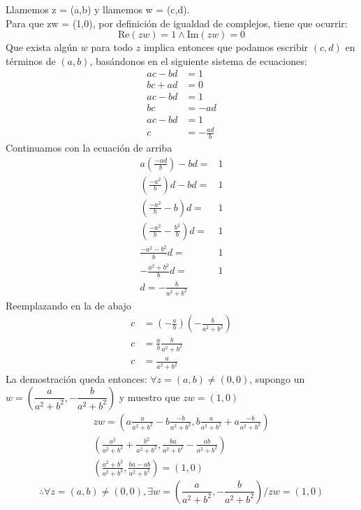 \documentclass[10pt]{article}
\begin{document}
\begin{prf}[$\forall z \neq (0,0) \exists w / zw = (1,0)$]{}
	Llamemos z = (a,b) y llamemos w = (c,d).\\
	Para que zw = (1,0), por definición de igualdad de complejos, tiene que ocurrir: 
	\begin{equation}
		\text{Re}(zw) = 1 \land \text{Im}(zw) = 0
	\end{equation}
	Que exista algún $w$ para todo $z$ implica entonces que podamos escribir $(c,d)$ en términos de $(a,b)$, basándonos en el siguiente sistema de ecuaciones:
	\begin{align}
		ac - bd &= 1\\
		bc + ad &= 0\\
		ac - bd &= 1\\
		bc &= -ad\\
		ac - bd &= 1\\
		c &= -\frac{ad}{b}
	\end{align}
	Continuamos con la ecuación de arriba
	\begin{align}
		a\left(\frac{-ad}{b}\right) - bd =& 1\\
		\left(\frac{-a^2}{b}\right)d - bd =& 1\\
		\left(\frac{-a^2}{b} - b\right)d =& 1\\
		\left(\frac{-a^2}{b} - \frac{b^2}{b}\right)d =& 1\\
		\frac{-a^2 - b^2}{b}d =& 1\\
		-\frac{a^2 + b^2}{b}d =& 1\\
		d = -\frac{b}{a^2 + b^2}&
	\end{align}
	Reemplazando en la de abajo
	\begin{align}
		c &= \left(-\frac{a}{b}\right)\left(-\frac{b}{a^2 + b^2}\right)\\
		c &= \frac{a}{b}\frac{b}{a^2 + b^2}\\
		c &= \frac{a}{a^2 + b^2}
	\end{align}
	La demostración queda entonces:
	$\forall z = (a,b) \neq (0,0)$, supongo un $w = \left(\dfrac{a}{a^2 + b^2}, -\dfrac{b}{a^2 + b^2}\right)$ y muestro que $zw = (1,0)$
	\begin{align}
		zw = \left(a\frac{a}{a^2 + b^2} - b\frac{-b}{a^2 + b^2}, b\frac{a}{a^2 + b^2} + a\frac{-b}{a^2 + b^2}\right)\\
		\left(\frac{a^2}{a^2 + b^2} + \frac{b^2}{a^2 + b^2}, \frac{ba}{a^2 + b^2} - \frac{ab}{a^2 + b^2}\right)\\
		\left(\frac{a^2 + b^2}{a^2 + b^2}, \frac{ba - ab}{a^2 + b^2}\right) = (1,0)
	\end{align}
	$$\therefore \forall z = (a,b) \neq (0,0), \exists w = (\frac{a}{a^2 + b^2}, -\frac{b}{a^2 + b^2}) / zw = (1,0)$$
\end{prf}
\end{document}
